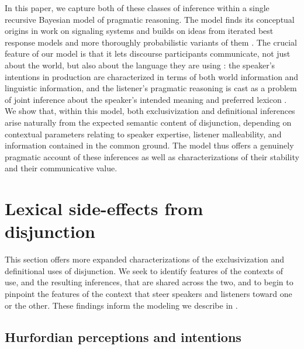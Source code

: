 \documentclass{article}
\begin{document}
In this paper, we capture both of these classes of inference within a
single recursive Bayesian model of pragmatic reasoning. The model
finds its conceptual origins in  work on signaling
systems and builds on ideas from iterated best response models
\citep{Jaeger:2007,Jaeger:2011,Franke09DISS} and more thoroughly
probabilistic variants of them
\citep{CamererHo:2004,Frank:Goodman:2012}. The crucial feature of our
model is that it lets discourse participants communicate, not just
about the world, but also about the language they are using
\citep{Bergen:Goodman:Levy:2012,bergen-levy-goodman:2014}: the
speaker's intentions in production are characterized in terms of both
world information and linguistic information, and the listener's
pragmatic reasoning is cast as a problem of joint inference about the
speaker's intended meaning and preferred lexicon
\citep{Smith:Goodman:Frank:2013}. We show that, within this model,
both exclusivization and definitional inferences arise naturally from
the expected semantic content of disjunction, depending on contextual
parameters relating to speaker expertise, listener malleability, and
information contained in the common ground. The model thus offers a
genuinely pragmatic account of these inferences as well as
characterizations of their stability and their communicative value.


\section{Lexical side-effects from disjunction}\label{sec:data}

This section offers more expanded characterizations of the
exclusivization and definitional uses of disjunction. We seek to
identify features of the contexts of use, and the resulting
inferences, that are shared across the two, and to begin to pinpoint
the features of the context that steer speakers and listeners toward
one or the other. These findings inform the modeling we describe in
.



\subsection{Hurfordian perceptions and intentions}\label{sec:data:overlapping}
\end{document}
